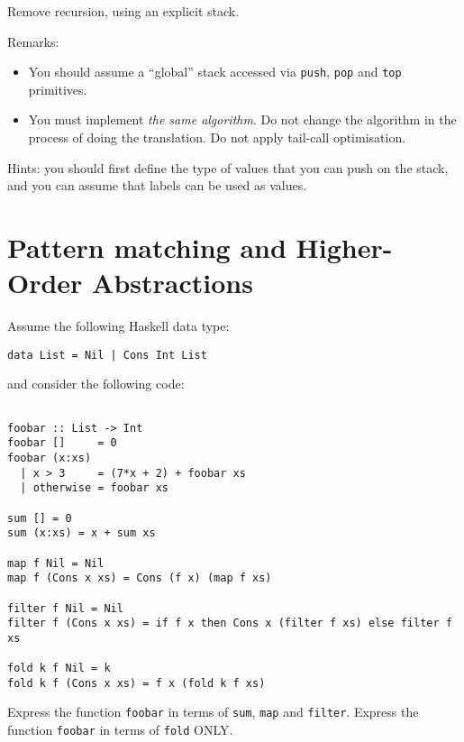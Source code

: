 \documentclass{article}
\newcommand{\answer}[1]{}
\begin{document}
Remove recursion, using an explicit stack. 

Remarks:

\begin{itemize}
\item  You should assume a ``global'' stack accessed via \texttt{push},
  \texttt{pop} and \texttt{top} primitives.

\item You must implement \emph{the same algorithm}. Do not change the
  algorithm in the process of doing the translation. Do not apply
  tail-call optimisation.
\end{itemize}

Hints: you should first define the type of values that you can push on
the stack, and you can assume that labels can be used as values.

\answer{
Stack frame: (n:Int,tmp:Int,caller:Pointer)

fib:
  if top.n == 0
     result = 0;
     goto top.caller
  else if top.n == 1
     result = 1
     goto top.caller
  else
     push (n-1,X,ret1)
     goto fib
ret1:
     pop;
     top.tmp = result;
     push (n-2,X,ret2);
     goto fib;
ret2:
     pop;
     result := result + top.tmp;
     goto top.caller;  
}

\newpage
\section{Pattern matching and Higher-Order Abstractions}

Assume the following Haskell data type:
\begin{verbatim}
data List = Nil | Cons Int List
\end{verbatim}
and consider the following code:
\begin{verbatim}

foobar :: List -> Int
foobar []     = 0
foobar (x:xs)
  | x > 3     = (7*x + 2) + foobar xs
  | otherwise = foobar xs

sum [] = 0
sum (x:xs) = x + sum xs

map f Nil = Nil
map f (Cons x xs) = Cons (f x) (map f xs)

filter f Nil = Nil
filter f (Cons x xs) = if f x then Cons x (filter f xs) else filter f xs

fold k f Nil = k
fold k f (Cons x xs) = f x (fold k f xs)
\end{verbatim}

Express the function \texttt{foobar} in terms of \texttt{sum}, \texttt{map} and \texttt{filter}.
Express the function \texttt{foobar} in terms of \texttt{fold} ONLY.
\end{document}
